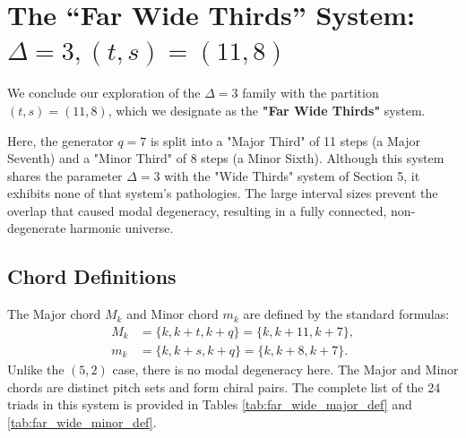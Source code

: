 \documentclass[12pt,letterpaper]{amsart}
\begin{document}
\section{The ``Far Wide Thirds'' System: \texorpdfstring{$\Delta=3, (t,s)=(11,8)$}{Delta=3, (t,s)=(11,8)}}
\label{sec:far_wide}

We conclude our exploration of the $\Delta=3$ family with the partition $(t,s)=(11,8)$, which we designate as the \textbf{"Far Wide Thirds"} system.

Here, the generator $q=7$ is split into a "Major Third" of 11 steps (a Major Seventh) and a "Minor Third" of 8 steps (a Minor Sixth). Although this system shares the parameter $\Delta=3$ with the "Wide Thirds" system of Section 5, it exhibits none of that system's pathologies. The large interval sizes prevent the overlap that caused modal degeneracy, resulting in a fully connected, non-degenerate harmonic universe.

\subsection{Chord Definitions}
The Major chord $M_k$ and Minor chord $m_k$ are defined by the standard formulas:
\begin{align}
    M_k &= \{k, k+t, k+q\} = \{k, k+11, k+7\}, \\
    m_k &= \{k, k+s, k+q\} = \{k, k+8, k+7\}.
\end{align}
Unlike the $(5,2)$ case, there is no modal degeneracy here. The Major and Minor chords are distinct pitch sets and form chiral pairs. The complete list of the 24 triads in this system is provided in Tables \ref{tab:far_wide_major_def} and \ref{tab:far_wide_minor_def}.
\end{document}
